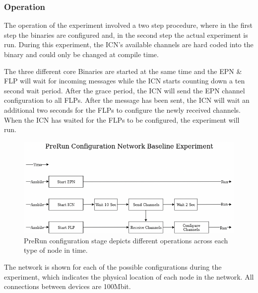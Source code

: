 \documentclass[]{article}
\begin{document}
\subsubsection{Operation}
The operation of the experiment involved a two step procedure, where in the first step the binaries are configured and, in the second step the actual experiment is run. During this experiment, the ICN’s available channels are hard coded into the binary and could only be changed at compile time. 

The three different core Binaries are started at the same time and the EPN \& FLP will wait for incoming messages while the ICN starts counting down a ten second wait period. After the grace period, the ICN will send the EPN channel configuration to all FLPs. After the message has been sent, the ICN will wait an additional two seconds for the FLPs to configure the newly received channels. When the ICN has waited for the FLPs to be configured, the experiment will run.

\begin{center}
	\begin{figure}[H]
		\includegraphics[width=\textwidth]{images/no-zookeeper-flow-n-base-exp}
		\caption{PreRun configuration stage depicts different operations across each type of node in time.}
		\label{fig:ssh}
	\end{figure}
\end{center}

The network is shown for each of the possible configurations during the experiment, which indicates the physical location of each node in the network. All connections between devices are 100Mbit.
\end{document}
